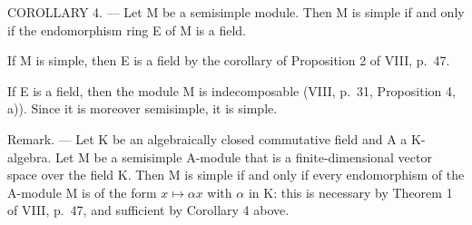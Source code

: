 COROLLARY 4. --- Let M be a semisimple module. Then M is simple if and only if the endomorphism ring E of M is a field.

If M is simple, then E is a field by the corollary of Proposition 2 of VIII, p.~47.

If E is a field, then the module M is indecomposable (VIII, p.~31, Proposition 4, a)). Since it is moreover semisimple, it is simple.

Remark. --- Let K be an algebraically closed commutative field and A a K-algebra. Let M be a semisimple A-module that is a finite-dimensional vector space over the field K. Then M is simple if and only if every endomorphism of the A-module M is of the form \(x \mapsto \alpha x\) with \(\alpha\) in K: this is necessary by Theorem 1 of VIII, p.~47, and sufficient by Corollary 4 above.

